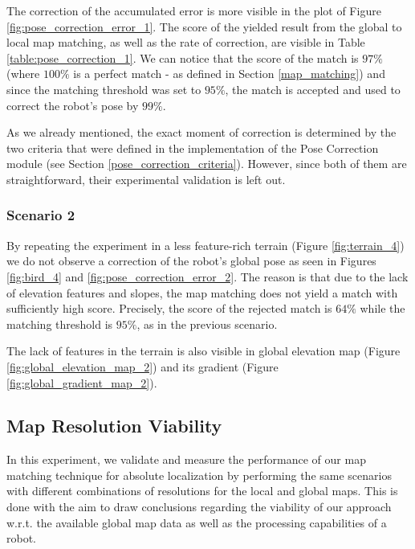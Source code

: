 The correction of the accumulated error is more visible in the plot of
Figure \ref{fig:pose_correction_error_1}.
The score of the yielded result from the global to local map matching,
as well as the rate of correction, are visible in Table
\ref{table:pose_correction_1}.
We can notice that the score of the match is $97\%$ (where $100\%$ is a
perfect match - as defined in Section \ref{map_matching}) and since
the matching threshold was set to $95\%$, the match is accepted and used
to correct the robot's pose by $99\%$.

As we already mentioned, the exact moment of correction is determined by
the two criteria that were defined in the implementation of the Pose Correction
module (see Section \ref{pose_correction_criteria}).
However, since both of them are straightforward, their experimental
validation is left out.

\subsubsection{Scenario 2}

By repeating the experiment in a less feature-rich terrain
(Figure \ref{fig:terrain_4}) we do not observe a correction of the
robot's global pose as seen in Figures \ref{fig:bird_4} and
\ref{fig:pose_correction_error_2}.
The reason is that due to the lack of elevation features and slopes,
the map matching does not yield a match with sufficiently high score.
Precisely, the score of the rejected match is $64\%$ while the matching
threshold is $95\%$, as in the previous scenario.

The lack of features in the terrain is also visible in global
elevation map (Figure \ref{fig:global_elevation_map_2}) and its gradient
(Figure \ref{fig:global_gradient_map_2}).

\subsection{Map Resolution Viability}

In this experiment, we validate and measure the performance of our map
matching technique for absolute localization by performing the same
scenarios with different combinations of resolutions for the local and
global maps.
This is done with the aim to draw conclusions regarding the viability
of our approach w.r.t. the available global map data as well as
the processing capabilities of a robot.

